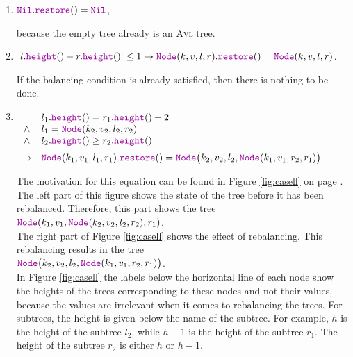 \begin{enumerate}
\item $\mytt{Nil}.\mytt{restore}() = \mytt{Nil}$,

      because the empty tree already is an  \textsc{Avl} tree.
\item $|l.\mytt{height}() - r.\mytt{height}()| \leq 1 \rightarrow 
       \mytt{Node}(k,v,l,r).\mytt{restore}() = \mytt{Node}(k,v,l,r)$.

      If the balancing condition is already satisfied, then there is nothing to be done. 
\item $\begin{array}[t]{cl}
              & l_1.\mytt{height}() = r_1.\mytt{height}() + 2    \\ 
       \wedge & l_1 = \mytt{Node}(k_2,v_2,l_2,r_2)                 \\
       \wedge & l_2.\mytt{height}() \geq r_2.\mytt{height}()     \\[0.2cm]
       \rightarrow & \mytt{Node}(k_1,v_1,l_1,r_1).\mytt{restore}() = 
                     \mytt{Node}\bigl(k_2,v_2,l_2,\mytt{Node}(k_1,v_1,r_2,r_1)\bigr)
       \end{array}
      $

      The motivation for this equation can be found in Figure \ref{fig:casell}
      on page \pageref{fig:casell}.  The left part of this figure shows the state
      of the tree before it has been rebalanced.  Therefore, this part shows the tree
      \\[0.2cm]
      \hspace*{1.3cm}
      $\mytt{Node}(k_1,v_1, \mytt{Node}(k_2,v_2,l_2,r_2), r_1)$. 
      \\[0.2cm]
      The right part of Figure \ref{fig:casell} shows the effect of rebalancing.  
      This rebalancing results in the tree
      \\[0.2cm]
      \hspace*{1.3cm}
      $\mytt{Node}\bigl(k_2,v_2,l_2,\mytt{Node}(k_1,v_1,r_2,r_1)\bigr)$.
      \\[0.2cm]
      In Figure \ref{fig:casell} the labels below the horizontal line of each node show the heights
      of the trees corresponding to these nodes and not their values, because the values are irrelevant when it comes
      to rebalancing the trees.  For subtrees, the height is given below the name of
      the subtree.  For example,  $h$ is the height of the subtree 
      $l_2$, while $h-1$ is the height of the subtree $r_1$. The height of the subtree $r_2$
      is either $h$ or $h-1$.


\end{enumerate}
